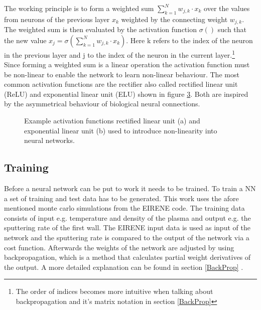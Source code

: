 			The working principle is to form a weighted sum $\sum_{k=1}^{N} w_{j,k} \cdot x_{k}$ over the values from neurons of the previous layer $x_{k}$ weighted by the connecting weight $w_{j,k}$. The weighted sum is then evaluated by the activation function $\sigma()$ such that the new value $x_j = \sigma(\sum_{k=1}^{N} w_{j,k} \cdot x_{k})$. Here k refers to the index of the neuron in the previous layer and j to the index of the neuron in the current layer.\footnote{The order of indices becomes more intuitive when talking about backpropagation and it's matrix notation in section \ref{BackProp}}\\
			Since forming a weighted sum is a linear operation the activation function must be non-linear to enable the network to learn non-linear behaviour. The most common activation functions are the rectifier also called rectified linear unit (ReLU) and exponential linear unit (ELU) shown in figure \ref{ReLUELU}. Both are inspired by the asymmetrical behaviour of biological neural connections.\\
			
			\begin{figure}
				\begin{subfigure}{.49\textwidth}
					\centering
					\label{ReLU}
				\end{subfigure}
				\begin{subfigure}{.49\textheight}
					\centering
					\label{ELU}
				\end{subfigure}
				\caption{Example activation functions rectified linear unit (a) and  exponential linear unit (b) used to introduce non-linearity into neural networks.}
				\label{ReLUELU}
			\end{figure}
			\subsection{Training}
			Before a neural network can be put to work it needs to be trained. To train a NN a set of training and test data has to be generated. This work uses the afore mentioned monte carlo simulations from the EIRENE code.
			The training data consists of input e.g. temperature and density of the plasma and output e.g. the sputtering rate of the first wall. The EIRENE input data is used as input of the network and the sputtering rate is compared to the output of the network via a cost function. Afterwards the weights of the network are adjusted by using backpropagation, which is a method that calculates partial weight derivatives of the output. A more detailed explanation can be found in section \ref{BackProp} .\\
			
